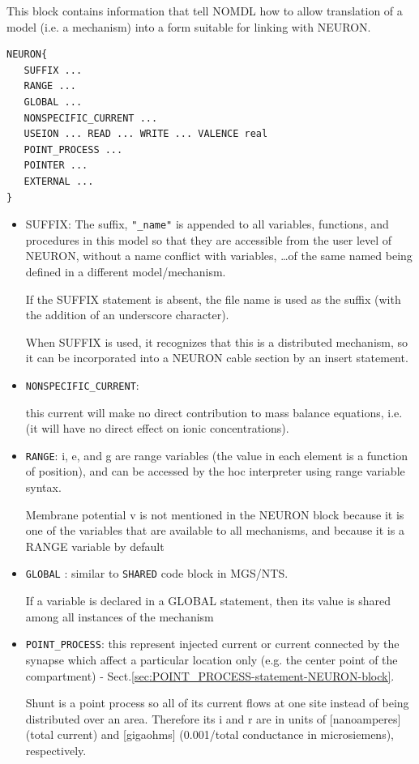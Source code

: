 This block contains information that tell NOMDL how to allow
translation of a model (i.e. a mechanism) into a form suitable for linking with
NEURON.
\begin{verbatim}
NEURON{
   SUFFIX ...
   RANGE ...
   GLOBAL ...
   NONSPECIFIC_CURRENT ...
   USEION ... READ ... WRITE ... VALENCE real
   POINT_PROCESS ...
   POINTER ...
   EXTERNAL ...
}
\end{verbatim}
\begin{itemize}
  \item SUFFIX: The suffix, \verb!"_name"! is appended to all variables,
  functions, and procedures in this model so that they are accessible from
  the user level of NEURON, without a name conflict with variables, \ldots of
  the same named being defined in a different model/mechanism.
  
  If the SUFFIX statement is absent, the file name is used as the suffix (with
  the addition of an underscore character).
  
When SUFFIX is used, it recognizes that this is a distributed mechanism,
so it can be incorporated into a NEURON cable section by an insert statement.  
  
  \item \verb!NONSPECIFIC_CURRENT!: 
  
  this current will make no direct contribution to mass balance equations, i.e. 
  (it will have no direct effect on ionic concentrations).
  
  
  \item \verb!RANGE!: i, e, and g are range variables (the value in each element
  is a function of position), and can be accessed by the hoc interpreter using
  range variable syntax.

Membrane potential v is not mentioned in the NEURON block because it is
one of the variables that are available to all mechanisms, and because it is a
RANGE variable by default

  \item \verb!GLOBAL! : similar to \verb!SHARED! code block in MGS/NTS. 
  
  If a variable is declared in a GLOBAL statement, then its value is shared
  among all instances of the mechanism
  
  \item \verb!POINT_PROCESS!: this represent injected current or current
  connected by the synapse which affect a particular location only (e.g. the
  center point of the compartment) -
  Sect.\ref{sec:POINT_PROCESS-statement-NEURON-block}.
  
  Shunt is a point process so all of its current flows at one site instead of
  being distributed over an area. Therefore its i and r are in units of
  [nanoamperes] (total current) and [gigaohms] (0.001/total conductance in
  microsiemens), respectively.
  
\end{itemize}

